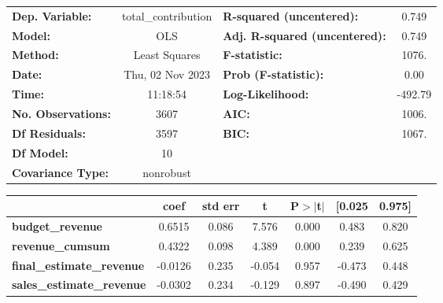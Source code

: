 \begin{center}
\begin{tabular}{lclc}
\toprule
\textbf{Dep. Variable:}                & total\_contribution & \textbf{  R-squared (uncentered):}      &     0.749   \\
\textbf{Model:}                        &         OLS         & \textbf{  Adj. R-squared (uncentered):} &     0.749   \\
\textbf{Method:}                       &    Least Squares    & \textbf{  F-statistic:       }          &     1076.   \\
\textbf{Date:}                         &   Thu, 02 Nov 2023  & \textbf{  Prob (F-statistic):}          &     0.00    \\
\textbf{Time:}                         &       11:18:54      & \textbf{  Log-Likelihood:    }          &   -492.79   \\
\textbf{No. Observations:}             &          3607       & \textbf{  AIC:               }          &     1006.   \\
\textbf{Df Residuals:}                 &          3597       & \textbf{  BIC:               }          &     1067.   \\
\textbf{Df Model:}                     &            10       & \textbf{                     }          &             \\
\textbf{Covariance Type:}              &      nonrobust      & \textbf{                     }          &             \\
\bottomrule
\end{tabular}
\begin{tabular}{lcccccc}
                                       & \textbf{coef} & \textbf{std err} & \textbf{t} & \textbf{P$> |$t$|$} & \textbf{[0.025} & \textbf{0.975]}  \\
\midrule
\textbf{budget\_revenue}               &       0.6515  &        0.086     &     7.576  &         0.000        &        0.483    &        0.820     \\
\textbf{revenue\_cumsum}               &       0.4322  &        0.098     &     4.389  &         0.000        &        0.239    &        0.625     \\
\textbf{final\_estimate\_revenue}      &      -0.0126  &        0.235     &    -0.054  &         0.957        &       -0.473    &        0.448     \\
\textbf{sales\_estimate\_revenue}      &      -0.0302  &        0.234     &    -0.129  &         0.897        &       -0.490    &        0.429     \\

\end{tabular}
\end{center}
